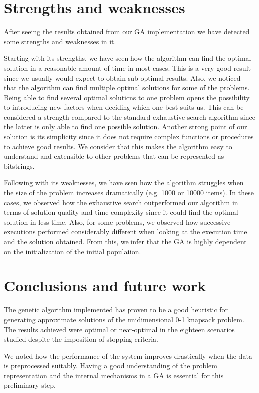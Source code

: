 \documentclass[anon]{CI}
\begin{document}
\section{Strengths and weaknesses} \label{sec:strengths}

After seeing the results obtained from our GA implementation we have detected some strengths and weaknesses in it.

Starting with its strengths, we have seen how the algorithm can find the optimal solution in a reasonable amount of time in most cases. This is a very good result since we usually would expect to obtain sub-optimal results. Also, we noticed that the algorithm can find multiple optimal solutions for some of the problems. Being able to find several optimal solutions to one problem opens the possibility to introducing new factors when deciding which one best suits us. This can be considered a strength compared to the standard exhaustive search algorithm since the latter is only able to find one possible solution. Another strong point of our solution is its simplicity since it does not require complex functions or procedures to achieve good results. We consider that this makes the algorithm easy to understand and extensible to other problems that can be represented as bitstrings.

Following with its weaknesses, we have seen how the algorithm struggles when the size of the problem increases dramatically (e.g. 1000 or 10000 items). In these cases, we observed how the exhaustive search outperformed our algorithm in terms of solution quality and time complexity since it could find the optimal solution in less time. Also, for some problems, we observed how successive executions performed considerably different when looking at the execution time and the solution obtained. From this, we infer that the GA is highly dependent on the initialization of the initial population.

\section{Conclusions and future work}

The genetic algorithm implemented has proven to be a good heuristic for generating approximate solutions of the unidimensional 0-1 knapsack problem. The results achieved were optimal or near-optimal in the eighteen scenarios studied despite the imposition of stopping criteria. 

We noted how the performance of the system improves drastically when the data is preprocessed suitably. Having a good understanding of the problem representation and the internal mechanisms in a GA is essential for this preliminary step.
\end{document}
